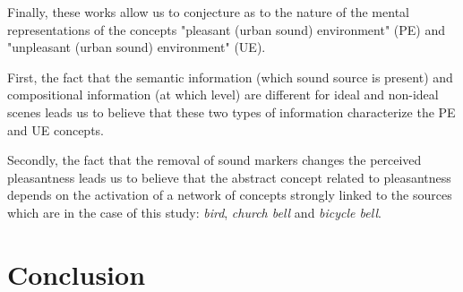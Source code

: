 \documentclass[12pt]{elsarticle}
\newcommand{\eg}{\emph{e.\,g.}}
\begin{document}

Finally, these works allow us to conjecture as to the nature of the mental representations of the concepts "pleasant (urban sound) environment" (PE) and "unpleasant (urban sound) environment" (UE).


First, the fact that the semantic information (which sound source is present) and compositional information (at which level) are different for ideal and non-ideal scenes leads us to believe that these two types of information characterize the PE and UE concepts.


Secondly, the fact that the removal of sound markers changes the perceived pleasantness leads us to believe that the abstract concept related to pleasantness depends on the activation of a network of concepts strongly linked to the sources which are in the case of this study: \emph{bird}, \emph{church bell} and \emph{bicycle bell}.



\section{Conclusion}
\end{document}
